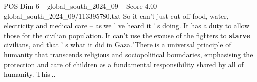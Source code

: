 \begin{textsample}{POS Dim 6 – global\_south\_2024\_09 – Score 4.00 – global\_south\_2024\_09/113395780.txt}
So it can't just cut off food, water, electricity and medical care -- as we ' ve heard it ' s doing.
It has a duty to allow those for the civilian population.
It can't use the excuse of the fighters to \textbf{starve} civilians, and that ' s what it did in Gaza."There is a universal principle of humanity that transcends religious and sociopolitical boundaries, emphasising the protection and care of children as a fundamental responsibility shared by all of humanity.
This...

\end{textsample}
